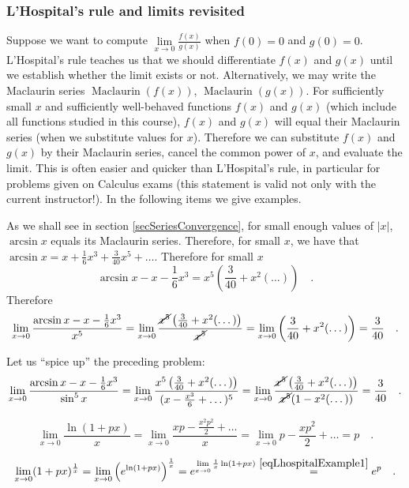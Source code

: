 \documentclass[12pt]{book}
\DeclareMathOperator{\maclaurin}{Maclaurin}
\begin{document}
\subsubsection{L'Hospital's rule and limits revisited}\label{secLHospitalRevisited}
Suppose we want to compute $\lim\limits_{x\to 0} \frac{f(x)}{g(x)}$ when $f(0)= 0$ and $g(0)=0$. 
L'Hospital's rule teaches us that we should differentiate $f(x)$ and $g(x)$ until we establish whether the limit exists or not. Alternatively, we may write the Maclaurin series $\maclaurin (f(x))$, $\maclaurin (g(x))$. For sufficiently small $x$ and sufficiently well-behaved functions $f(x)$ and $g(x)$ (which include all functions studied in this course), $f(x)$ and $g(x)$ will equal their Maclaurin series (when we substitute values for $x$). Therefore we can substitute $f(x)$ and $g(x)$ by their Maclaurin series, cancel the common power of $x$, and evaluate the limit. This is often easier and quicker than L'Hospital's rule, in particular for problems given on Calculus exams (this statement is valid not only with the current instructor!). In the following items we give examples. 

As we shall see in section \ref{secSeriesConvergence}, for small enough values of $|x|$, $\arcsin x$ equals its Maclaurin series. Therefore, for small $x$, we have that $\arcsin x = x+\frac{1}6x^3 + \frac{3}{40}x^5+\dots $. Therefore for small $x$
\[
\arcsin x- x- \frac{1}6x^3= x^5 \left(\frac{3}{40}+x^2(\dots)\right)\quad .
\] Therefore 
\[
\lim\limits_{x\to 0} \frac{\arcsin x- x- \frac{1}6x^3}{x^5}= \lim\limits_{x\to 0} \frac{ \cancel{x^5} \left(\frac{3}{40}+x^2(\dots)\right)}{\cancel{x^5}} =  \lim\limits_{x\to 0}  \left(\frac{3}{40}+x^2(\dots)\right) =\frac{3}{40}\quad .
\]

Let us ``spice up'' the preceding problem:
\[
\lim\limits_{x\to 0} \frac{\arcsin x- x- \frac{1}6x^3}{\sin^{5} x}= \lim\limits_{x\to 0} \frac{x^5 \left(\frac{3}{40}+x^2(\dots)\right)}{(x-\frac{x^3}6+\dots)^5}=  \lim\limits_{x\to 0} \frac{\cancel{x^5} \left(\frac{3}{40}+x^2(\dots)\right)}{\cancel{x^5}(1-x^2(\dots))}= \frac{3}{40}\quad .
\]

\begin{equation}\label{eqLhospitalExample1}
\lim\limits_{x\to 0}\frac{\ln(1+px)}{x}=\lim \limits_{x\to 0} \frac{xp- \frac{x^2p^2}{2}+\dots  }{x}= \lim \limits_{x\to 0} p- \frac{xp^2}{2}+\dots = p\quad .
\end{equation}

\begin{equation}\label{eqLhospitalExample2}
\lim\limits_{x\to 0}(1+px)^{\frac1x}= \lim\limits_{x\to 0} \left(e^{\ln (1+px)}\right)^{\frac1x} = e^{\lim\limits_{x\to 0}\frac{1}x\ln (1+px)} \stackrel{\eqref{eqLhospitalExample1}}{=}e^{p}\quad .
\end{equation}
\end{document}
